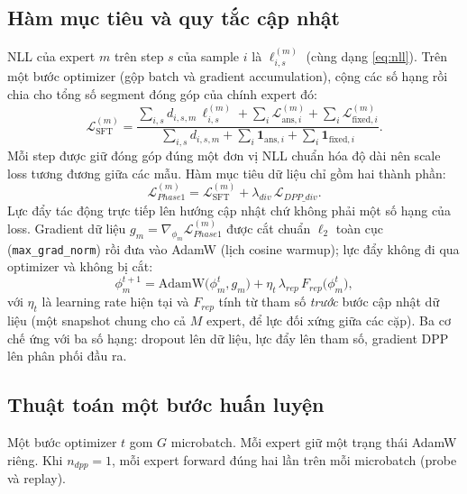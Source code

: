 \documentclass[12pt,a4paper]{article}
\theoremstyle{plain}
\begin{document}
\subsection{Hàm mục tiêu và quy tắc cập nhật}
\label{sec:phase1obj}

NLL của expert $m$ trên step $s$ của sample $i$ là $\ell^{(m)}_{i,s}$ (cùng dạng \eqref{eq:nll}). Trên một bước optimizer (gộp batch và gradient accumulation), cộng các số hạng rồi chia cho tổng số segment đóng góp của chính expert đó:
\begin{equation}
\label{eq:sftmean}
\mathcal L_{\mathrm{SFT}}^{(m)}=
\frac{\sum_{i,s}d_{i,s,m}\,\ell_{i,s}^{(m)}+\sum_i\mathcal L_{\mathrm{ans},i}^{(m)}+\sum_i\mathcal L_{\mathrm{fixed},i}^{(m)}}
{\sum_{i,s}d_{i,s,m}+\sum_i\mathbf 1_{\mathrm{ans},i}+\sum_i\mathbf 1_{\mathrm{fixed},i}}.
\end{equation}
Mỗi step được giữ đóng góp đúng một đơn vị NLL chuẩn hóa độ dài nên scale loss tương đương giữa các mẫu. Hàm mục tiêu dữ liệu chỉ gồm hai thành phần:
\begin{equation}
\label{eq:phase1}
\mathcal L_{Phase1}^{(m)}=\mathcal L_{\mathrm{SFT}}^{(m)}+\lambda_{div}\,\mathcal L_{DPP\_div}.
\end{equation}
Lực đẩy tác động trực tiếp lên hướng cập nhật chứ không phải một số hạng của loss. Gradient dữ liệu $g_m=\nabla_{\phi_m}\mathcal L_{Phase1}^{(m)}$ được cắt chuẩn $\ell_2$ toàn cục (\texttt{max\_grad\_norm}) rồi đưa vào AdamW (lịch cosine warmup); lực đẩy không đi qua optimizer và không bị cắt:
\begin{equation}
\label{eq:phase1update}
\phi_m^{t+1}=\mathrm{AdamW}\!\big(\phi_m^{t},g_m\big)+\eta_t\,\lambda_{rep}\,F_{rep}\!\big(\phi_m^{t}\big),
\end{equation}
với $\eta_t$ là learning rate hiện tại và $F_{rep}$ tính từ tham số \emph{trước} bước cập nhật dữ liệu (một snapshot chung cho cả $M$ expert, để lực đối xứng giữa các cặp). Ba cơ chế ứng với ba số hạng: dropout lên dữ liệu, lực đẩy lên tham số, gradient DPP lên phân phối đầu ra.

\subsection{Thuật toán một bước huấn luyện}
\label{sec:p1algo}

Một bước optimizer $t$ gom $G$ microbatch. Mỗi expert giữ một trạng thái AdamW riêng. Khi $n_{dpp}=1$, mỗi expert forward đúng hai lần trên mỗi microbatch (probe và replay).
\end{document}
